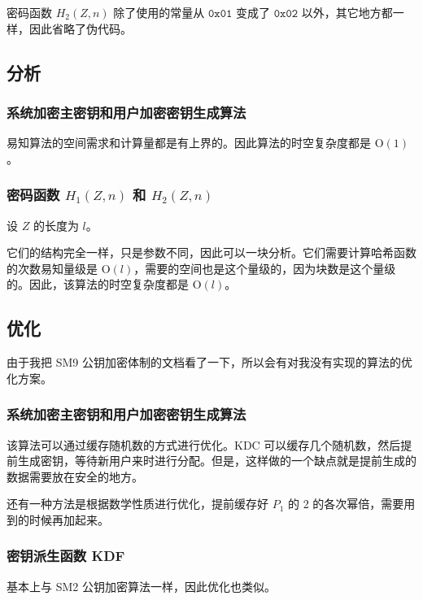 \documentclass[12pt,a4paper]{article}
\begin{document}
密码函数 $ H_2(Z, n) $ 除了使用的常量从 $ \mathtt{0x01} $ 变成了 $ \mathtt{0x02} $ 以外，其它地方都一样，因此省略了伪代码。

\subsection*{分析}

\subsubsection*{系统加密主密钥和用户加密密钥生成算法}

易知算法的空间需求和计算量都是有上界的。因此算法的时空复杂度都是 $ \mathrm{O}(1) $。

\subsubsection*{密码函数 $ H_1(Z, n) $ 和 $ H_2(Z, n) $}

设 $ Z $ 的长度为 $ l $。

它们的结构完全一样，只是参数不同，因此可以一块分析。它们需要计算哈希函数的次数易知量级是 $ \mathrm{O}(l) $，需要的空间也是这个量级的，因为块数是这个量级的。因此，该算法的时空复杂度都是 $ \mathrm{O}(l) $。

\subsection*{优化}

由于我把 SM9 公钥加密体制的文档看了一下，所以会有对我没有实现的算法的优化方案。

\subsubsection*{系统加密主密钥和用户加密密钥生成算法}

该算法可以通过缓存随机数的方式进行优化。KDC 可以缓存几个随机数，然后提前生成密钥，等待新用户来时进行分配。但是，这样做的一个缺点就是提前生成的数据需要放在安全的地方。

还有一种方法是根据数学性质进行优化，提前缓存好 $ P_1 $ 的 2 的各次幂倍，需要用到的时候再加起来。

\subsubsection*{密钥派生函数 KDF}

基本上与 SM2 公钥加密算法一样，因此优化也类似。
\end{document}
